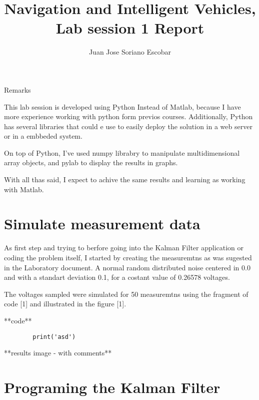 \documentclass{article}
\begin{document}
    \title{Navigation and Intelligent Vehicles, Lab session 1 Report}
    \author{Juan Jose Soriano Escobar}
    \maketitle
    \newpage

    Remarks

    This lab session is developed using Python Instead of Matlab, because I have more experience working with python form previos courses. Additionally,
    Python has several libraries that could e use to easily deploy the solution in a web server or in a embbeded system.

    On top of Python, I've used numpy librabry to manipulate multidimensional array objects, and pylab to display the results in graphs. 

    With all thas said, I expect to achive the same results and learning as working with Matlab.

    \section{Simulate measurement data}
    

    As  first step and trying to berfore going into the Kalman Filter application  or coding the problem itself, I started by creating the measuremtns
    as was sugested in the Laboratory document. A normal random distributed noise centered in 0.0 and with a standart deviation 0.1, for a
    costant value of 0.26578 voltages.

    The voltages sampled were simulated for 50 measuremtns using the fragment of code [1] and illustrated in the figure [1].

    **code**
    \begin{lstlisting}
        print('asd')
        \end{lstlisting}

    **results image - with comments**
    
      

    \section{Programing the Kalman Filter}
\end{document}
